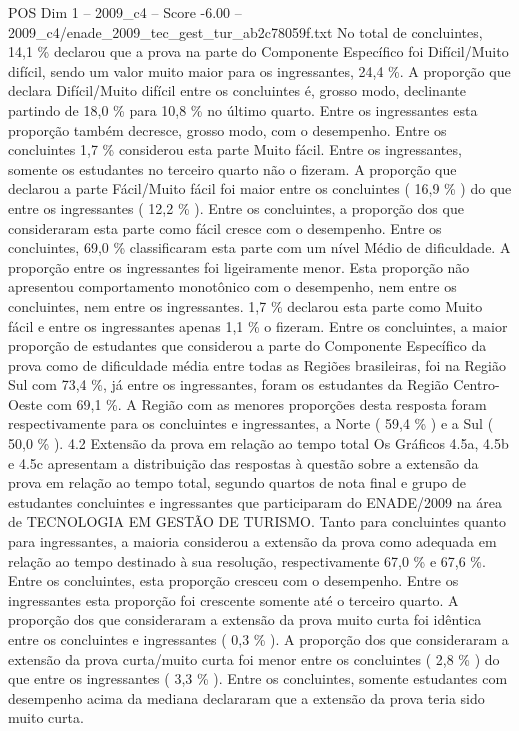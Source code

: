 \begin{textsample}{POS Dim 1 – 2009\_c4 – Score -6.00 – 2009\_c4/enade\_2009\_tec\_gest\_tur\_ab2c78059f.txt}
No total de concluintes, 14,1 \% declarou que a prova na parte do Componente Específico foi Difícil/Muito difícil, sendo um valor muito maior para os ingressantes, 24,4 \%.
A proporção que declara Difícil/Muito difícil entre os concluintes é, grosso modo, declinante partindo de 18,0 \% para 10,8 \% no último quarto.
Entre os ingressantes esta proporção também decresce, grosso modo, com o desempenho.
Entre os concluintes 1,7 \% considerou esta parte Muito fácil.
Entre os ingressantes, somente os estudantes no terceiro quarto não o fizeram.
A proporção que declarou a parte Fácil/Muito fácil foi maior entre os concluintes ( 16,9 \% ) do que entre os ingressantes ( 12,2 \% ).
Entre os concluintes, a proporção dos que consideraram esta parte como fácil cresce com o desempenho.
Entre os concluintes, 69,0 \% classificaram esta parte com um nível Médio de dificuldade.
A proporção entre os ingressantes foi ligeiramente menor.
Esta proporção não apresentou comportamento monotônico com o desempenho, nem entre os concluintes, nem entre os ingressantes. 1,7 \% declarou esta parte como Muito fácil e entre os ingressantes apenas 1,1 \% o fizeram.
Entre os concluintes, a maior proporção de estudantes que considerou a parte do Componente Específico da prova como de dificuldade média entre todas as Regiões brasileiras, foi na Região Sul com 73,4 \%, já entre os ingressantes, foram os estudantes da Região Centro-Oeste com 69,1 \%.
A Região com as menores proporções desta resposta foram respectivamente para os concluintes e ingressantes, a Norte ( 59,4 \% ) e a Sul ( 50,0 \% ). 4.2 Extensão da prova em relação ao tempo total Os Gráficos 4.5a, 4.5b e 4.5c apresentam a distribuição das respostas à questão sobre a extensão da prova em relação ao tempo total, segundo quartos de nota final e grupo de estudantes concluintes e ingressantes que participaram do ENADE/2009 na área de TECNOLOGIA EM GESTÃO DE TURISMO.
Tanto para concluintes quanto para ingressantes, a maioria considerou a extensão da prova como adequada em relação ao tempo destinado à sua resolução, respectivamente 67,0 \% e 67,6 \%.
Entre os concluintes, esta proporção cresceu com o desempenho.
Entre os ingressantes esta proporção foi crescente somente até o terceiro quarto.
A proporção dos que consideraram a extensão da prova muito curta foi idêntica entre os concluintes e ingressantes ( 0,3 \% ).
A proporção dos que consideraram a extensão da prova curta/muito curta foi menor entre os concluintes ( 2,8 \% ) do que entre os ingressantes ( 3,3 \% ).
Entre os concluintes, somente estudantes com desempenho acima da mediana declararam que a extensão da prova teria sido muito curta.

\end{textsample}
